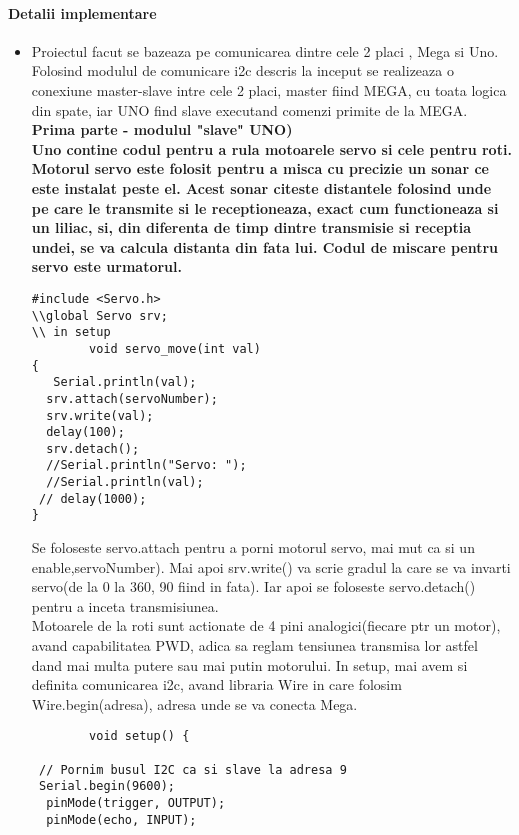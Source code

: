 \paragraph{Detalii implementare}
\begin{itemize}
\item
	\tab Proiectul facut se bazeaza pe comunicarea dintre cele 2 placi , Mega si Uno. Folosind modulul de comunicare i2c descris la inceput se realizeaza o conexiune master-slave intre cele 2 placi, master fiind MEGA, cu toata logica din spate, iar UNO find slave executand comenzi primite de la MEGA.\\
	\tab\tab \bf{Prima parte - modulul "slave" UNO)}\\
	\tab Uno contine codul pentru a rula motoarele servo si cele pentru roti. Motorul servo este folosit pentru a misca cu precizie un sonar ce este instalat peste el. Acest sonar citeste distantele folosind unde pe care le transmite si le receptioneaza, exact cum functioneaza si un liliac, si, din diferenta de timp dintre transmisie si receptia undei, se va calcula distanta din fata lui. Codul de miscare pentru servo este urmatorul.\\
	\begin{verbatim}
#include <Servo.h>
\\global Servo srv;
\\ in setup 
		void servo_move(int val)
{
   Serial.println(val);
  srv.attach(servoNumber);
  srv.write(val);
  delay(100);
  srv.detach();
  //Serial.println("Servo: ");
  //Serial.println(val);
 // delay(1000);
}
	\end{verbatim}
	\tab Se foloseste servo.attach pentru a porni motorul servo, mai mut ca si un enable,servoNumber). Mai apoi srv.write() va scrie gradul la care se va invarti servo(de la 0 la 360, 90 fiind in fata). Iar apoi se foloseste servo.detach() pentru a inceta transmisiunea.\\

	\tab Motoarele de la roti sunt actionate de 4 pini analogici(fiecare ptr un motor), avand capabilitatea PWD, adica sa reglam tensiunea transmisa lor astfel dand mai multa putere sau mai putin motorului. In setup, mai avem si definita comunicarea i2c, avand libraria Wire in care folosim Wire.begin(adresa), adresa unde se va conecta Mega.\\

	\begin{verbatim}
		void setup() {

 // Pornim busul I2C ca si slave la adresa 9
 Serial.begin(9600);
  pinMode(trigger, OUTPUT);
  pinMode(echo, INPUT);


\end{verbatim}
\end{itemize}

